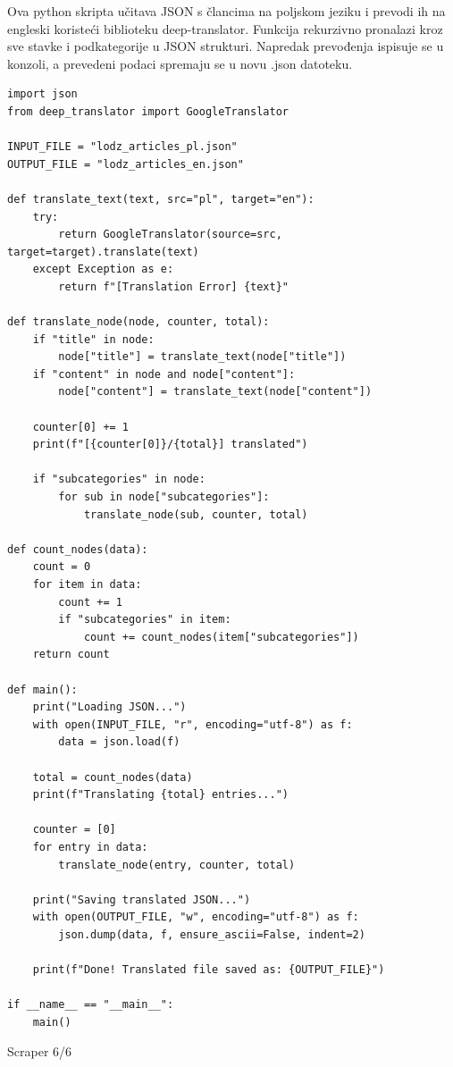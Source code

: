 \documentclass[]{foi}
\begin{document}
Ova python skripta učitava JSON s člancima na poljskom jeziku i prevodi ih na engleski koristeći biblioteku deep-translator. Funkcija rekurzivno pronalazi
kroz sve stavke i podkategorije u JSON strukturi. Napredak prevođenja ispisuje se u konzoli, a prevedeni podaci spremaju se u novu .json
datoteku.
\begin{longlisting}
\begin{verbatim}
import json
from deep_translator import GoogleTranslator

INPUT_FILE = "lodz_articles_pl.json"
OUTPUT_FILE = "lodz_articles_en.json"

def translate_text(text, src="pl", target="en"):
    try:
        return GoogleTranslator(source=src, target=target).translate(text)
    except Exception as e:
        return f"[Translation Error] {text}"

def translate_node(node, counter, total):
    if "title" in node:
        node["title"] = translate_text(node["title"])
    if "content" in node and node["content"]:
        node["content"] = translate_text(node["content"])

    counter[0] += 1
    print(f"[{counter[0]}/{total}] translated")

    if "subcategories" in node:
        for sub in node["subcategories"]:
            translate_node(sub, counter, total)

def count_nodes(data):
    count = 0
    for item in data:
        count += 1
        if "subcategories" in item:
            count += count_nodes(item["subcategories"])
    return count

def main():
    print("Loading JSON...")
    with open(INPUT_FILE, "r", encoding="utf-8") as f:
        data = json.load(f)

    total = count_nodes(data)
    print(f"Translating {total} entries...")

    counter = [0] 
    for entry in data:
        translate_node(entry, counter, total)

    print("Saving translated JSON...")
    with open(OUTPUT_FILE, "w", encoding="utf-8") as f:
        json.dump(data, f, ensure_ascii=False, indent=2)

    print(f"Done! Translated file saved as: {OUTPUT_FILE}")

if __name__ == "__main__":
    main()

\end{verbatim}
\caption{Scraper 6/6}
\label{lst:scraper6}
\end{longlisting}
\end{document}
